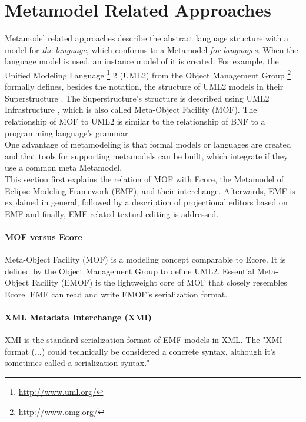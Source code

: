 \section{Metamodel Related Approaches} \label{sec:metaApproaches}
Metamodel related approaches describe the abstract language structure with a model for \emph{the language}, which conforms to a Metamodel \emph{for languages}. When the language model is used, an instance model of it is created. For example, the Unified Modeling Language \footnote{\raggedright \url{http://www.uml.org/}}  2 (UML2) from the Object Management Group \footnote{\raggedright \url{http://www.omg.org/}} formally defines, besides the notation, the structure of UML2 models in their Superstructure \cite{Uml23s}. The Superstructure's structure is described using UML2 Infrastructure \cite{Uml23i}, which is also called Meta-Object Facility (MOF). The relationship of MOF to UML2 is similar to the relationship of BNF to a programming language's grammar.\\
One advantage of metamodeling is that formal models or languages are created and that tools for supporting metamodels can be built, which integrate if they use a common meta Metamodel.\\

This section first explains the relation of MOF with Ecore, the Metamodel of Eclipse Modeling Framework (EMF), and their interchange. Afterwards, EMF is explained in general, followed by a description of projectional editors based on EMF and finally, EMF related textual editing is addressed.

\paragraph{MOF versus Ecore}
Meta-Object Facility (MOF) is a modeling concept comparable to Ecore. It is defined by the Object Management Group \cite{OMG} to define UML2. Essential Meta-Object Facility (EMOF) is the lightweight core of MOF that closely resembles Ecore. EMF can read and write EMOF's serialization format. \cite{EMP}

\paragraph{XML Metadata Interchange (XMI)}
XMI is the standard serialization format of EMF models in XML. The "XMI format (...) could technically be considered a concrete syntax, although it's sometimes called a serialization syntax." \cite{EMP}


